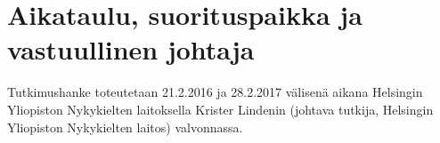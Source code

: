 \documentclass[12pt,a4paper,finnish,oneside]{article}
\begin{document}
\section{Aikataulu, suorituspaikka ja vastuullinen johtaja}


Tutkimushanke toteutetaan 21.2.2016 ja 28.2.2017 välisenä aikana Helsingin Yliopiston Nykykielten laitoksella Krister Lindenin (johtava tutkija, Helsingin Yliopiston Nykykielten laitos) valvonnassa.






\end{document}
